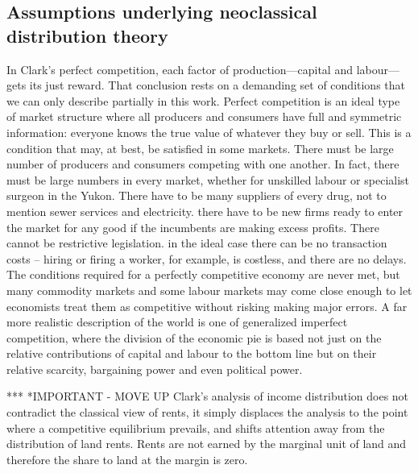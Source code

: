 \subsection{Assumptions underlying neoclassical distribution theory}
 In Clark's  perfect competition, %
 each factor of production—capital and labour—gets its just reward. That conclusion rests on a demanding set of conditions that we can only describe partially in this work. Perfect competition is an ideal type of market structure where all producers and consumers have full and symmetric information: everyone knows the true value of whatever they buy or sell.  This is a condition that may, at best, be satisfied in some markets. There must be large number of producers and consumers competing with one another. In fact, there must be large numbers in every market, whether for unskilled labour or specialist surgeon in the Yukon.  There have to be many suppliers of every drug, not to mention sewer services and electricity. there have to be new firms ready to enter the market  for any good  if the incumbents are making excess profits. There cannot be restrictive legislation. in the ideal case there can be no transaction costs -- hiring or firing a worker, for example,  is costless,  and there are no delays. The conditions required for a perfectly competitive economy are never met, but many commodity markets and some labour markets may come close enough to let economists treat them as competitive without risking making major errors. 
 A far more realistic description of the world is one of generalized  \gls{imperfect competition}, where the division of the economic pie is based not just on the relative contributions of capital and labour to the bottom line but on their relative scarcity, bargaining power and even political power.  %
 
*** *IMPORTANT - MOVE UP Clark's analysis of income distribution does not contradict the classical view of rents, it simply displaces the analysis to the point where a competitive equilibrium prevails, and shifts attention away from the distribution of land rents. Rents are not earned by the marginal unit of land and therefore the share to land at the margin is zero. 

